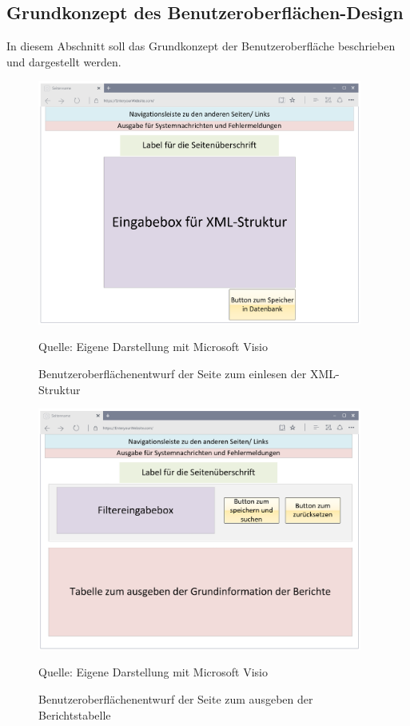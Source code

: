\subsection{Grundkonzept des Benutzeroberflächen-Design}
\label{subsec:grundkonzept-des-benutzeroberflachen-design}

In diesem Abschnitt soll das Grundkonzept der Benutzeroberfläche beschrieben und dargestellt werden.

\begin{figure}[H]
    \centering
    \includegraphics[width=0.95\textwidth]{Grafiken/Overlay_Einleseseite}
    \caption{Benutzeroberflächenentwurf der Seite zum einlesen der XML-Struktur}
    \label{fig: Benutzeroberflächenentwurf der Seite zum einlesen der XML-Struktur}
    {Quelle: Eigene Darstellung mit Microsoft Visio}
\end{figure}


\begin{figure}[H]
    \centering
    \includegraphics[width=0.95\textwidth]{Grafiken/Overlay_Tabellenseite}
    \caption{Benutzeroberflächenentwurf der Seite zum ausgeben der Berichtstabelle}
    \label{fig: Benutzeroberflächenentwurf der Seite zum ausgeben der Berichtstabelle}
    {Quelle: Eigene Darstellung mit Microsoft Visio}
\end{figure}


